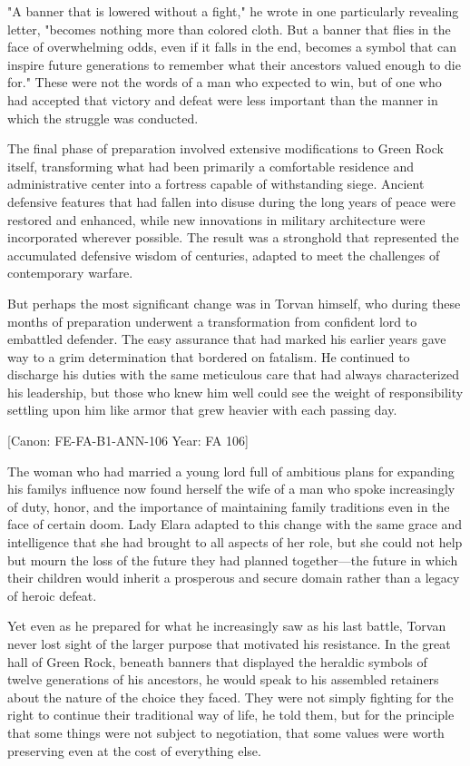 "A banner that is lowered without a fight," he wrote in one particularly
revealing letter, "becomes nothing more than colored cloth. But a banner
that flies in the face of overwhelming odds, even if it falls in the
end, becomes a symbol that can inspire future generations to remember
what their ancestors valued enough to die for." These were not the words
of a man who expected to win, but of one who had accepted that victory
and defeat were less important than the manner in which the struggle was
conducted.

The final phase of preparation involved extensive modifications to Green
Rock itself, transforming what had been primarily a comfortable
residence and administrative center into a fortress capable of
withstanding siege. Ancient defensive features that had fallen into
disuse during the long years of peace were restored and enhanced, while
new innovations in military architecture were incorporated wherever
possible. The result was a stronghold that represented the accumulated
defensive wisdom of centuries, adapted to meet the challenges of
contemporary warfare.

But perhaps the most significant change was in Torvan himself, who
during these months of preparation underwent a transformation from
confident lord to embattled defender. The easy assurance that had marked
his earlier years gave way to a grim determination that bordered on
fatalism. He continued to discharge his duties with the same meticulous
care that had always characterized his leadership, but those who knew
him well could see the weight of responsibility settling upon him like
armor that grew heavier with each passing day.

{[}Canon: FE-FA-B1-ANN-106 \textbar{} Year: FA 106{]}

The woman who had married a young lord full of ambitious plans for
expanding his family\textquotesingle s influence now found herself the
wife of a man who spoke increasingly of duty, honor, and the importance
of maintaining family traditions even in the face of certain doom. Lady
Elara adapted to this change with the same grace and intelligence that
she had brought to all aspects of her role, but she could not help but
mourn the loss of the future they had planned together---the future in
which their children would inherit a prosperous and secure domain rather
than a legacy of heroic defeat.

Yet even as he prepared for what he increasingly saw as his last battle,
Torvan never lost sight of the larger purpose that motivated his
resistance. In the great hall of Green Rock, beneath banners that
displayed the heraldic symbols of twelve generations of his ancestors,
he would speak to his assembled retainers about the nature of the choice
they faced. They were not simply fighting for the right to continue
their traditional way of life, he told them, but for the principle that
some things were not subject to negotiation, that some values were worth
preserving even at the cost of everything else.

